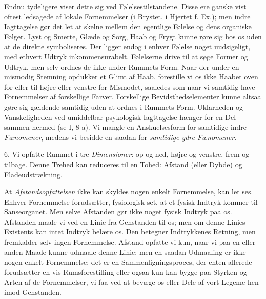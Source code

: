 \documentclass[12pt,a4paper,openany]{book}
\newcommand{\opage}[1]{\marginnote{\footnotesize\textit{[#1]}}}
\begin{document}
Endnu tydeligere viser dette sig ved Følelsestilstandene. Disse ere
ganske vist oftest ledsagede af lokale Fornemmelser (i Brystet, i
Hjertet f. Ex.); men indre Iagttagelse gør det let at skelne mellem den
egentlige Følelse og dens organiske Følger. Lyst og Smerte, Glæde og
Sorg, Haab og Frygt kunne røre sig hos os uden at de direkte
symboliseres. Der ligger endog i enhver Følelse noget uudsigeligt, med
ethvert Udtryk inkommensurabelt. Følelserne drive til at søge Former og
Udtryk, men selv ordnes de ikke under Rummets Form. Naar der under en
mismodig Stemning opdukker et Glimt af Haab, forestille vi os ikke
Haabet oven for eller til højre eller venstre for Mismodet, saaledes som
naar vi samtidig have Fornemmelser af forskellige Farver. Forskellige
Bevidsthedselementer kunne altsaa gøre sig gældende samtidig uden at
ordnes i Rummets Form. Uklarheden og Vanskeligheden ved umiddelbar
psykologisk Iagttagelse hænger for en Del sammen hermed (se I, 8 a). Vi
mangle en Anskuelsesform for samtidige indre \emph{Fænomener}, medens vi
besidde en saadan for \emph{samtidige ydre Fænomener}.

6. Vi opfatte Rummet i tre \emph{Dimensioner}: op og ned, højre og
venstre, frem og tilbage. Denne Trehed kan reduceres til en Tohed:
Afstand (eller Dybde) og Fladeudstrækning.


\opage{237}At \emph{Afstandsopfattelsen} ikke kan skyldes nogen enkelt
Fornemmelse, kan let ses. Enhver Fornemmelse forudsætter, fysiologisk
set, at et fysisk Indtryk kommer til Sanseorganet. Men selve Afstanden
gør ikke noget fysisk Indtryk paa os. Afstanden maale vi ved en Linie
fra Genstanden til os; men om denne Linies Existents kan intet Indtryk
belære os. Den betegner Indtrykkenes Retning, men fremkalder selv ingen
Fornemmelse. Afstand opfatte vi kun, naar vi paa en eller anden Maade
kunne udmaale denne Linie; men en saadan Udmaaling er ikke nogen enkelt
Fornemmelse; det er en Sammenligningsproces, der enten allerede
forudsætter en vis Rumsforestilling eller ogsaa kun kan bygge paa
Styrken og Arten af de Fornemmelser, vi faa ved at bevæge os eller Dele
af vort Legeme hen imod Genstanden.
\end{document}
